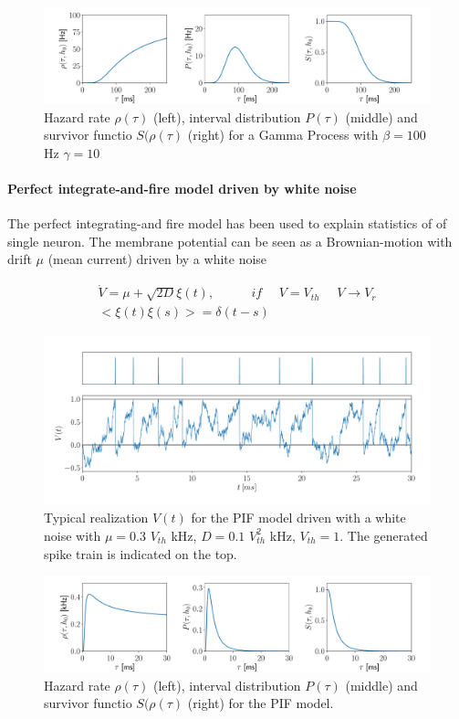\documentclass[12pt,twoside]{report}
\begin{document}
\begin{figure}[h!]
	\includegraphics[width=\linewidth]{gamma.pdf}
	\caption{Hazard rate $\rho(\tau)$ (left), interval distribution $P(\tau)$ (middle) and survivor functio $S(\rho(\tau)$ (right) for a Gamma Process with $\beta=100$ Hz
		$\gamma=10$ }
	\label{fig:gammaprocess}
\end{figure}

\paragraph{Perfect integrate-and-fire model driven by white noise}
\label{sec:pif}
The perfect integrating-and fire model has been used  to explain statistics of of single neuron. The membrane potential can be seen as a Brownian-motion with drift $\mu$ (mean current) driven by a white noise


\begin{align}
\label{eq:Vxi}
\dot V=\mu +\sqrt{2D}\xi(t), \:\:\:\:\:\:\:\: \:\:\:\:\: if\:\:\:\:\:\:  V=V_{th}\:\:\:\:\:\:V\rightarrow V_r\\ 
<\xi(t)\xi(s)>=\delta(t-s)
\end{align}

\begin{figure}[h!]
	\centering
	\includegraphics[width=0.8\linewidth]{PIF_V}
	\caption{Typical realization $V(t)$ for the PIF model driven with a white noise with $\mu=0.3$ $V_{th}$ kHz, $D=0.1$ $V_{th}^2$ kHz, $V_{th}=1$. The generated spike train is indicated on the top.
	}
	\label{fig:PIF_V}
\end{figure}


\begin{figure}[h!]
	
	\includegraphics[width=\linewidth]{inversegaussian.pdf}
	\caption{Hazard rate $\rho(\tau)$ (left), interval distribution $P(\tau)$ (middle) and survivor functio $S(\rho(\tau)$ (right) for the PIF model.
	}
	\label{fig:inversegaussianprocess}
\end{figure}
\end{document}
